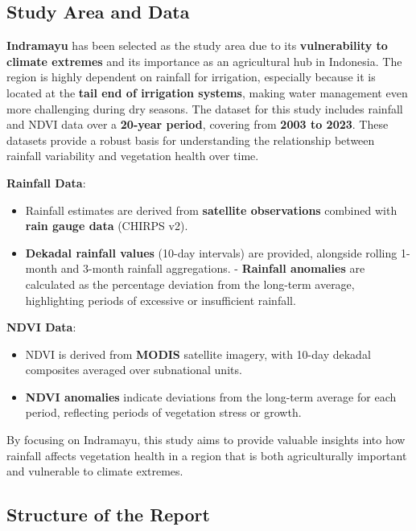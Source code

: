 \documentclass[
]{article}
\begin{document}
\subsection{Study Area and Data}\label{study-area-and-data}

\textbf{Indramayu} has been selected as the study area due to its
\textbf{vulnerability to climate extremes} and its importance as an
agricultural hub in Indonesia. The region is highly dependent on
rainfall for irrigation, especially because it is located at the
\textbf{tail end of irrigation systems}, making water management even
more challenging during dry seasons. The dataset for this study includes
rainfall and NDVI data over a \textbf{20-year period}, covering from
\textbf{2003 to 2023}. These datasets provide a robust basis for
understanding the relationship between rainfall variability and
vegetation health over time.

\textbf{Rainfall Data}:

\begin{itemize}
\item
  Rainfall estimates are derived from \textbf{satellite observations}
  combined with \textbf{rain gauge data} (CHIRPS v2).
\item
  \textbf{Dekadal rainfall values} (10-day intervals) are provided,
  alongside rolling 1-month and 3-month rainfall aggregations. -
  \textbf{Rainfall anomalies} are calculated as the percentage deviation
  from the long-term average, highlighting periods of excessive or
  insufficient rainfall.
\end{itemize}

\textbf{NDVI Data}:

\begin{itemize}
\item
  NDVI is derived from \textbf{MODIS} satellite imagery, with 10-day
  dekadal composites averaged over subnational units.
\item
  \textbf{NDVI anomalies} indicate deviations from the long-term average
  for each period, reflecting periods of vegetation stress or growth.
\end{itemize}

By focusing on Indramayu, this study aims to provide valuable insights
into how rainfall affects vegetation health in a region that is both
agriculturally important and vulnerable to climate extremes.

\subsection{Structure of the Report}\label{structure-of-the-report}
\end{document}
